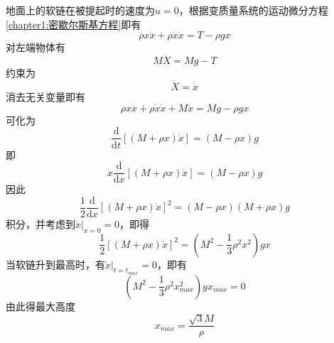 \begin{solution}
地面上的软链在被提起时的速度为$u =0$，根据变质量系统的运动微分方程\eqref{chapter1:密歇尔斯基方程}即有
\begin{equation*}
	\rho x \ddot{x} + \rho \dot{x} \dot{x} = T - \rho gx
\end{equation*}
对左端物体有
\begin{equation*}
	M\ddot{X} = Mg - T
\end{equation*}
约束为
\begin{equation*}
	\dot{X} = \dot{x}
\end{equation*}
消去无关变量即有
\begin{equation*}
	\rho x \ddot{x} + \rho \dot{x} \dot{x} + M\ddot{x} = Mg - \rho g x
\end{equation*}
可化为
\begin{equation*}
	\frac{\mathrm{d}}{\mathrm{d} t} [(M+\rho x) \dot{x}] = (M-\rho x) g
\end{equation*}
即
\begin{equation*}
	\dot{x} \frac{\mathrm{d}}{\mathrm{d} x} [(M+\rho x) \dot{x}] = (M-\rho x) g
\end{equation*}
因此
\begin{equation*}
	\frac12 \frac{\mathrm{d}}{\mathrm{d} x} [(M+\rho x) \dot{x}]^2 = (M-\rho x)(M+\rho x) g
\end{equation*}
积分，并考虑到$\dot{x}\big|_{x=0} = 0$，即得
\begin{equation*}
	\frac12 \left[(M+\rho x)\dot{x}\right]^2 = \left(M^2 - \frac13 \rho^2 x^2\right) gx
\end{equation*}
当软链升到最高时，有$\dot{x}\big|_{t=t_{max}} = 0$，即有
\begin{equation*}
	\left(M^2 - \frac13 \rho^2 x^2_{max}\right) gx_{max} = 0
\end{equation*}
由此得最大高度
\begin{equation*}
	x_{max} = \frac{\sqrt{3}M}{\rho}
\end{equation*}
\end{solution}
